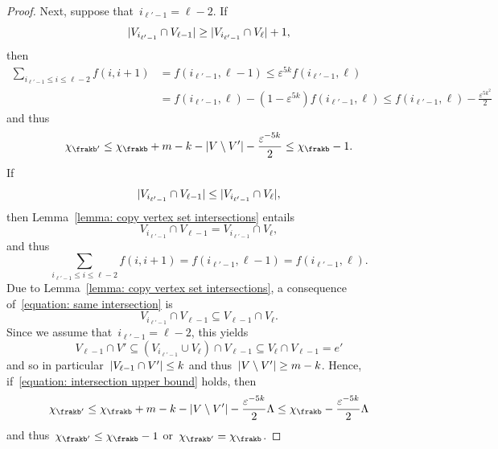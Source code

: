 \documentclass[11pt]{amsart}
\newcommand{\eps}{\varepsilon}
\DeclarePairedDelimiter{\abs}{\lvert}{\rvert}
\theoremstyle{definition}
\numberwithin{equation}{section}
\begin{document}
\begin{proof}
		Next, suppose that~$i_{\ell'-1}= \ell-2$.
		If
		\begin{equation*}
			\abs{V_{i_{\ell'-1}}\cap V_{\ell-1}}\geq \abs{V_{i_{\ell'-1}}\cap V_{\ell}}+1,
		\end{equation*}
		then
		\begin{align*}
			\sum_{i_{\ell'-1}\leq i\leq \ell-2} f(i,i+1)
			&=f(i_{\ell'-1},\ell-1)
			\leq \eps^{5k}f(i_{\ell'-1},\ell)\\
			&=f(i_{\ell'-1},\ell)-(1-\eps^{5k})f(i_{\ell'-1},\ell)
			\leq f(i_{\ell'-1},\ell)-\frac{\eps^{5k^2}}{2}
		\end{align*}
		and thus
		\begin{equation*}
			\chi_{\frakb'}\leq \chi_{\frakb}+m-k-\abs{V\setminus V'}-\frac{\eps^{-5k}}{2}
			\leq \chi_{\frakb}-1.
		\end{equation*}
		If
		\begin{equation}\label{equation: intersection upper bound}
			\abs{V_{i_{\ell'-1}}\cap V_{\ell-1}}\leq \abs{V_{i_{\ell'-1}}\cap V_{\ell}},
		\end{equation}
		then Lemma~\ref{lemma: copy vertex set intersections} entails
		\begin{equation}\label{equation: same intersection}
			V_{i_{\ell'-1}}\cap V_{\ell-1}= V_{i_{\ell'-1}}\cap V_{\ell},
		\end{equation}
		and thus
		\begin{equation*}
			\sum_{i_{\ell'-1}\leq i\leq \ell-2} f(i,i+1)
			=f(i_{\ell'-1},\ell-1)
			=f(i_{\ell'-1},\ell).
		\end{equation*}
		Due to Lemma~\ref{lemma: copy vertex set intersections}, a consequence of~\eqref{equation: same intersection} is
		\begin{equation*}
			V_{i_{\ell'-1}}\cap V_{\ell-1}\subseteq V_{\ell-1}\cap V_{\ell}.
		\end{equation*}
		Since we assume that~$i_{\ell'-1}= \ell-2$, this yields
		\begin{equation}\label{equation: what remains of ell-1}
			V_{\ell-1}\cap V'
			\subseteq (V_{i_{\ell'-1}}\cup V_\ell)\cap V_{\ell-1}
			\subseteq V_\ell\cap V_{\ell-1}
			=e'
		\end{equation}
		and so in particular~$\abs{V_{\ell-1}\cap V'}\leq k$ and thus~$\abs{V\setminus V'}\geq m-k$.
		Hence, if~\eqref{equation: intersection upper bound} holds, then
		\begin{equation}\label{equation: possible equality}
			\chi_{\frakb'}\leq\chi_{\frakb}+m-k-\abs{V\setminus V'}-\frac{\eps^{-5k}}{2}\Lambda \leq\chi_{\frakb}-\frac{\eps^{-5k}}{2}\Lambda
		\end{equation}
		and thus~$\chi_{\frakb'}\leq\chi_{\frakb}-1$ or~$\chi_{\frakb'}=\chi_{\frakb}$.
		

\end{proof}
\end{document}
